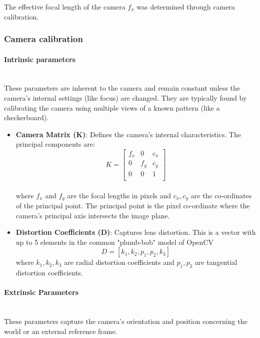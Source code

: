 The effective focal length of the camera $f_x$ was determined through camera calibration.

\subsubsection{Camera calibration}
\paragraph{Intrinsic parameters}\mbox{}\\
These parameters are inherent to the camera and remain constant unless the camera's internal settings (like focus) are changed. They are typically found by calibrating the camera using multiple views of a known pattern (like a checkerboard).

\begin{itemize}
    \item \textbf{Camera Matrix (K)}: Defines the camera's internal characteristics. The principal components are:
          \begin{equation}
              K = \begin{bmatrix}
                  f_x & 0   & c_x \\
                  0   & f_y & c_y \\
                  0   & 0   & 1   \\
              \end{bmatrix}
          \end{equation}\\
          where $f_x$ and $f_y$ are the focal lengths in pixels and $c_x, c_y$ are the co-ordinates of the principal point. The principal point is the pixel co-ordinate where the camera's principal axis intersects the image plane.

    \item \textbf{Distortion Coefficients (D)}: Captures lens distortion. This is a vector with up to 5 elements in the common "plumb-bob" model of OpenCV
          \[
              D = [k_1, k_2, p_1, p_2, k_3]
          \]
          where $k_1, k_2, k_3$ are radial distortion coefficients and $p_1, p_2$ are tangential distortion coefficients.
\end{itemize}

\paragraph{Extrinsic Parameters}\mbox{}\\
These parameters capture the camera's orientation and position concerning the world or an external reference frame.

